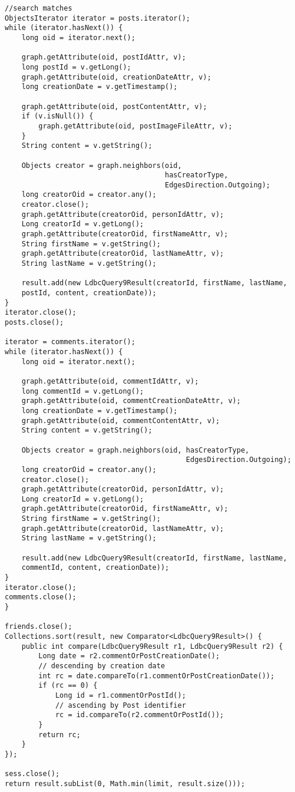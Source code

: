 {\begin{verbatim}
//search matches
ObjectsIterator iterator = posts.iterator();
while (iterator.hasNext()) {
    long oid = iterator.next();

    graph.getAttribute(oid, postIdAttr, v);
    long postId = v.getLong();
    graph.getAttribute(oid, creationDateAttr, v);
    long creationDate = v.getTimestamp();

    graph.getAttribute(oid, postContentAttr, v);
    if (v.isNull()) {
        graph.getAttribute(oid, postImageFileAttr, v);
    }
    String content = v.getString();

    Objects creator = graph.neighbors(oid, 
                                      hasCreatorType, 
                                      EdgesDirection.Outgoing);
    long creatorOid = creator.any();
    creator.close();
    graph.getAttribute(creatorOid, personIdAttr, v);
    Long creatorId = v.getLong();
    graph.getAttribute(creatorOid, firstNameAttr, v);
    String firstName = v.getString();
    graph.getAttribute(creatorOid, lastNameAttr, v);
    String lastName = v.getString();

    result.add(new LdbcQuery9Result(creatorId, firstName, lastName,
    postId, content, creationDate));
}
iterator.close();
posts.close();

iterator = comments.iterator();
while (iterator.hasNext()) {
    long oid = iterator.next();

    graph.getAttribute(oid, commentIdAttr, v);
    long commentId = v.getLong();
    graph.getAttribute(oid, commentCreationDateAttr, v);
    long creationDate = v.getTimestamp();
    graph.getAttribute(oid, commentContentAttr, v);
    String content = v.getString();

    Objects creator = graph.neighbors(oid, hasCreatorType, 
                                           EdgesDirection.Outgoing);
    long creatorOid = creator.any();
    creator.close();
    graph.getAttribute(creatorOid, personIdAttr, v);
    Long creatorId = v.getLong();
    graph.getAttribute(creatorOid, firstNameAttr, v);
    String firstName = v.getString();
    graph.getAttribute(creatorOid, lastNameAttr, v);
    String lastName = v.getString();

    result.add(new LdbcQuery9Result(creatorId, firstName, lastName,
    commentId, content, creationDate));
}
iterator.close();
comments.close();
}

friends.close();
Collections.sort(result, new Comparator<LdbcQuery9Result>() {
    public int compare(LdbcQuery9Result r1, LdbcQuery9Result r2) {
        Long date = r2.commentOrPostCreationDate();
        // descending by creation date
        int rc = date.compareTo(r1.commentOrPostCreationDate()); 
        if (rc == 0) {
            Long id = r1.commentOrPostId();
            // ascending by Post identifier
            rc = id.compareTo(r2.commentOrPostId()); 
        }
        return rc;
    }
});

sess.close();
return result.subList(0, Math.min(limit, result.size()));

\end{verbatim}
}

